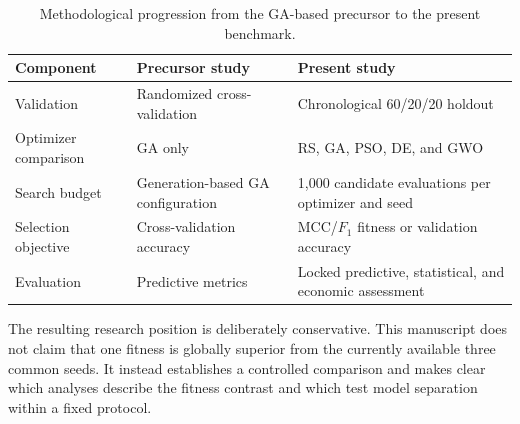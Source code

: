 \begin{table}[htbp]
\centering
\caption{Methodological progression from the GA-based precursor to the present benchmark.}
\label{tab:precursor_extension}
\small
\begin{tabularx}{\linewidth}{@{}L L L@{}}
\toprule
Component & Precursor study & Present study \\
\midrule
Validation & Randomized cross-validation & Chronological 60/20/20 holdout \\
Optimizer comparison & GA only & RS, GA, PSO, DE, and GWO \\
Search budget & Generation-based GA configuration & 1,000 candidate evaluations per optimizer and seed \\
Selection objective & Cross-validation accuracy & MCC/$F_1$ fitness or validation accuracy \\
Evaluation & Predictive metrics & Locked predictive, statistical, and economic assessment \\
\bottomrule
\end{tabularx}
\end{table}

The resulting research position is deliberately conservative. This manuscript does not claim that one fitness is globally superior from the currently available three common seeds. It instead establishes a controlled comparison and makes clear which analyses describe the fitness contrast and which test model separation within a fixed protocol.
